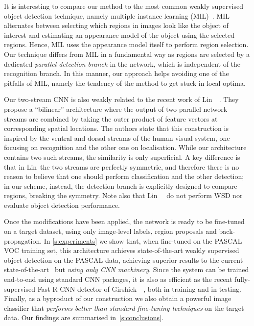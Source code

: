 \documentclass[10pt,twocolumn,letterpaper]{article}
\begin{document}
It is interesting to compare our method to the most common weakly supervised object detection technique, namely multiple instance learning (MIL)~\cite{Dietterich97}. MIL alternates between selecting which regions in images look like  the object of interest and estimating an appearance model of the object using the selected regions. Hence, MIL uses the appearance model itself to perform region selection. Our technique differs from MIL in a fundamental way as regions are selected by a dedicated \emph{parallel detection branch} in the network, which is independent of the recognition branch. In this manner, our approach helps avoiding one of the pitfalls of MIL, namely the tendency of the method to get stuck in local optima. 

Our two-stream CNN is also weakly related to the recent work of Lin~\etal~\cite{Lin15}. They propose a ``bilinear'' architecture where the output of two parallel network streams are combined by taking the outer product of feature vectors at corresponding spatial locations. The authors state that this construction is inspired by the ventral and dorsal streams of the human visual system, one focusing on recognition and the other one on localisation. While our architecture contains two such streams, the similarity is only superficial. A key difference is that in Lin~\etal the two streams are perfectly symmetric, and therefore there is no reason to believe that one should perform classification and the other detection; in our scheme, instead, the detection branch is explicitly designed to compare regions, breaking the symmetry. Note also that Lin~\etal~\cite{Lin15} do not perform WSD nor evaluate object detection performance.

Once the modifications have been applied, the network is ready to be fine-tuned on a target dataset, using only image-level labels, region proposals and back-propagation. In \cref{s:experiments} we show that, when fine-tuned on the PASCAL VOC training set, this architecture achieves state-of-the-art weakly supervised object detection on the PASCAL data, achieving superior results to the current state-of-the-art~\cite{Wang14a} but \emph{using only CNN machinery}. Since the system can be trained end-to-end using standard CNN packages, it is also as efficient as the recent fully-supervised Fast R-CNN detector of Girshick~\etal~\cite{Girshick15}, both in training and in testing. Finally, as a byproduct of our construction we also obtain a powerful image classifier that \emph{performs better than standard fine-tuning techniques} on the target data. Our findings are summarised in~\cref{s:conclusions}.
 
\end{document}
